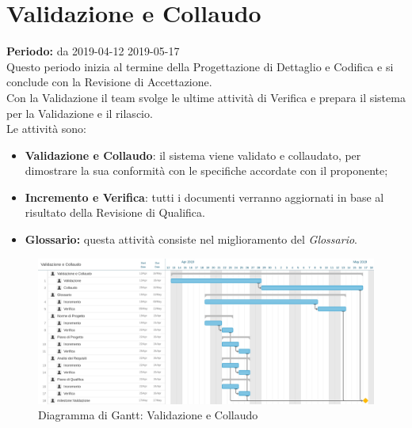\section{Validazione e Collaudo}
\textbf{Periodo:} da 2019-04-12 2019-05-17\\
Questo periodo inizia al termine della Progettazione di Dettaglio e Codifica e si conclude con la Revisione di Accettazione.\\Con la Validazione il team svolge le ultime attività di Verifica e prepara il sistema per la Validazione e il rilascio.\\
Le attività sono:
\begin{itemize}
    \item \textbf{Validazione e Collaudo}: il sistema viene validato e collaudato, per dimostrare la sua conformità con le specifiche accordate con il proponente;
    \item \textbf{Incremento e Verifica}: tutti i documenti verranno aggiornati in base al risultato della Revisione di Qualifica.
    \item \textbf{Glossario:} questa attività consiste nel miglioramento del \textit{Glossario}.
\end{itemize}
\begin{figure} [h]
    \centering
    \includegraphics[scale=0.1]{./images/validazione_collaudo.jpg}
    \caption{Diagramma di Gantt: Validazione e Collaudo }\label{}
\end{figure}